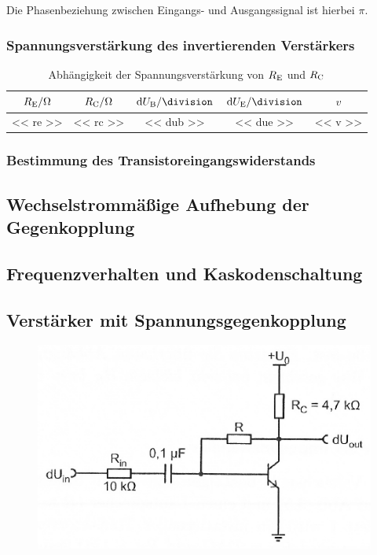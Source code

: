 Die Phasenbeziehung zwischen Eingangs- und Ausgangssignal ist hierbei $\pi$.

\subsubsection{Spannungsverstärkung des invertierenden Verstärkers}

\begin{table}
	\centering
	\begin{tabular}{SSSSS}
		{$\RE / \si\ohm$} &
		{$\RC / \si\ohm$} &
		{$\dif\UB / \si\division$} &
		{$\dif\UE / \si\division$} &
		{$v$} \\
		\hline
		<< re >> & << rc >> & << dub >> & << due >> & << v >> \\
	\end{tabular}
	\caption{%
		Abhängigkeit der Spannungsverstärkung von $\RE$ und $\RC$
	}
	\label{tab:412}
\end{table}

\fehlt

\subsubsection{Bestimmung des Transistoreingangswiderstands}

\fehlt

\subsection{Wechselstrommäßige Aufhebung der Gegenkopplung}

\fehlt

\subsection{Frequenzverhalten und Kaskodenschaltung}

\fehlt

\subsection{Verstärker mit Spannungsgegenkopplung}

\fehlt

\begin{figure}[htbp]
	\centering
	\includegraphics[width=.6\textwidth]{Anleitung/4-1.png}
	\caption{
		\cite[Abbildung~4.1]{physik313-Anleitung}
	}
	\label{fig:4-1}
\end{figure}

